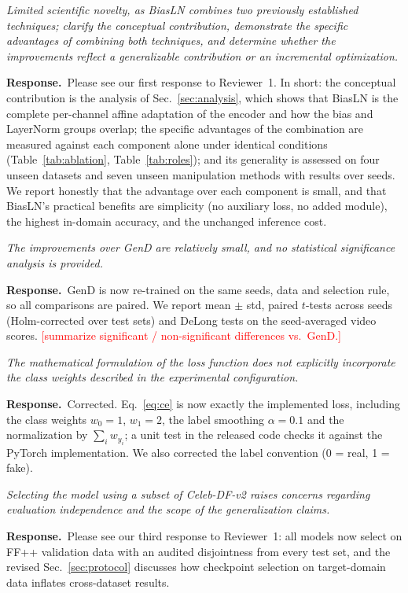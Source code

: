 \documentclass[11pt]{article}
\newif\ifpending\pendingtrue
\newcommand{\pending}[1]{\ifpending\textcolor{red}{[#1]}\else\errmessage{pending: #1}\fi}
\newenvironment{comment}{\par\medskip\noindent\begin{minipage}{\linewidth}\color{black!70}\itshape}{\end{minipage}\par\smallskip}
\newcommand{\resp}{\noindent\textbf{Response.}~}
\begin{document}
\begin{comment}
Limited scientific novelty, as BiasLN combines two previously established techniques; clarify the conceptual contribution, demonstrate the specific advantages of combining both techniques, and determine whether the improvements reflect a generalizable contribution or an incremental optimization.
\end{comment}
\resp Please see our first response to Reviewer~1. In short: the conceptual contribution is the analysis of Sec.~\ref{sec:analysis}, which shows that BiasLN is the complete per-channel affine adaptation of the encoder and how the bias and LayerNorm groups overlap; the specific advantages of the combination are measured against each component alone under identical conditions (Table~\ref{tab:ablation}, Table~\ref{tab:roles}); and its generality is assessed on four unseen datasets and seven unseen manipulation methods with results over seeds. We report honestly that the advantage over each component is small, and that BiasLN's practical benefits are simplicity (no auxiliary loss, no added module), the highest in-domain accuracy, and the unchanged inference cost.

\begin{comment}
The improvements over GenD are relatively small, and no statistical significance analysis is provided.
\end{comment}
\resp GenD is now re-trained on the same seeds, data and selection rule, so all comparisons are paired. We report mean $\pm$ std, paired $t$-tests across seeds (Holm-corrected over test sets) and DeLong tests on the seed-averaged video scores. \pending{summarize significant / non-significant differences vs.\ GenD.}

\begin{comment}
The mathematical formulation of the loss function does not explicitly incorporate the class weights described in the experimental configuration.
\end{comment}
\resp Corrected. Eq.~\eqref{eq:ce} is now exactly the implemented loss, including the class weights $w_0=1$, $w_1=2$, the label smoothing $\alpha=0.1$ and the normalization by $\sum_i w_{y_i}$; a unit test in the released code checks it against the PyTorch implementation. We also corrected the label convention (0 = real, 1 = fake).

\begin{comment}
Selecting the model using a subset of Celeb-DF-v2 raises concerns regarding evaluation independence and the scope of the generalization claims.
\end{comment}
\resp Please see our third response to Reviewer~1: all models now select on FF++ validation data with an audited disjointness from every test set, and the revised Sec.~\ref{sec:protocol} discusses how checkpoint selection on target-domain data inflates cross-dataset results.
\end{document}
